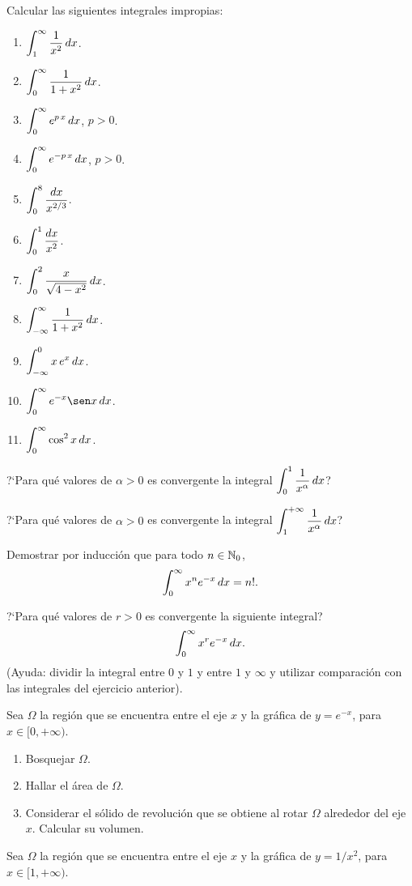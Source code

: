 \item Calcular las siguientes integrales impropias:
\begin{multicols}{2}
\begin{enumerate}
  \item $\displaystyle \int_1^\infty \frac1{x^2} \,dx$.
  \item $\displaystyle \int_0^\infty \frac1{1+x^2} \,dx$.
  \item $\displaystyle \int_0^\infty e^{p\,x}  \,dx$, $p>0$.
  \item $\displaystyle \int_0^\infty e^{-p\,x}  \,dx$, $p>0$.
  \item $\displaystyle \int_0^8 \frac{dx}{x^{2/3}}$.
  \item $\displaystyle \int_0^1 \frac{dx}{x^2}$.
  \item $\displaystyle \int_0^2 \frac{x}{\sqrt{4-x^2}}  \,dx$.
  \item $\displaystyle \int_{-\infty}^\infty \frac1{1+x^2}  \,dx$.
  \item $\displaystyle \int_{-\infty}^0 x\,e^x  \,dx$.
  \item $\D \int_0^\infty e^{-x}\sen x  \dx$.
  \item $\displaystyle \int_0^\infty \cos^2 x  \,dx$.
\end{enumerate}  
\end{multicols}
\item ?`Para qué valores de $\alpha>0$ es convergente la integral $\displaystyle \int_0^1 \frac1{x^\alpha}\,dx$?
\item ?`Para qué valores de $\alpha>0$ es convergente la integral $\displaystyle \int_1^{+\infty} \frac1{x^\alpha}\,dx$?
\item Demostrar por inducción que para todo $n\in\mathbb{N}_0$,
\[
\int_0^\infty x^n e^{-x}\,dx = n!.
\]
\item ?`Para qué valores de $r>0$ es convergente la siguiente integral?
\[
\int_0^\infty x^r e^{-x}\,dx.
\]
(Ayuda: dividir la integral entre $0$ y $1$ y entre $1$ y $\infty$ y utilizar comparación con las integrales del ejercicio anterior).
\item Sea $\Omega$ la región que se encuentra entre el eje $x$ y la gráfica de $y=e^{-x}$, para $x\in[0,+\infty)$.
\begin{enumerate}
  \item Bosquejar $\Omega$.
  \item Hallar el área de $\Omega$.
  \item Considerar el sólido de revolución que se obtiene al rotar $\Omega$ alrededor del eje $x$. Calcular su volumen.
\end{enumerate}
\item Sea $\Omega$ la región que se encuentra entre el eje $x$ y la gráfica de $y=1/x^2$, para $x\in[1,+\infty)$.
